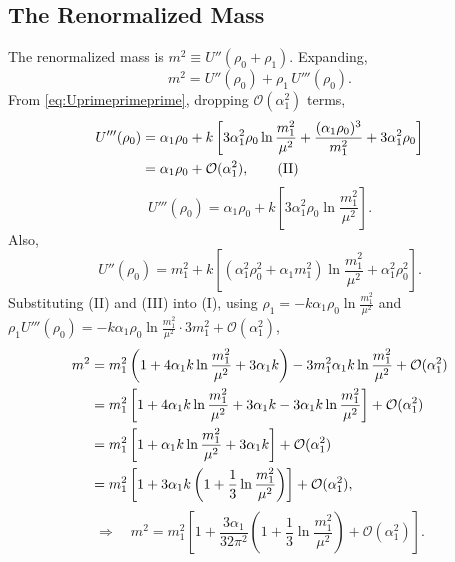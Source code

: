 \subsection*{The Renormalized Mass}

The renormalized mass is $m^2 \equiv U''(\rho_0+\rho_1)$. Expanding,
\begin{equation}
    m^2 = U''(\rho_0) + \rho_1\,U'''(\rho_0). \tag{I}
\end{equation}
From \eqref{eq:Uprimeprimeprime}, dropping $\mathcal{O}(\alpha_1^2)$
terms,
\begin{align}
    U'''(\rho_0) &= \alpha_1\rho_0 + k\left[3\alpha_1^2\rho_0
    \ln\frac{m_1^2}{\mu^2}
    + \frac{(\alpha_1\rho_0)^3}{m_1^2}
    + 3\alpha_1^2\rho_0\right] \notag\\
    &= \alpha_1\rho_0 + \mathcal{O}(\alpha_1^2), \tag{II}
\end{align}
\begin{equation}
    U'''(\rho_0) = \alpha_1\rho_0
    + k\left[3\alpha_1^2\rho_0\ln\frac{m_1^2}{\mu^2}\right]. \tag{III}
\end{equation}
Also,
\begin{equation}
    U''(\rho_0) = m_1^2 + k\left[(\alpha_1^2\rho_0^2
    + \alpha_1 m_1^2)\ln\frac{m_1^2}{\mu^2}
    + \alpha_1^2\rho_0^2\right].
\end{equation}
Substituting (II) and (III) into (I), using
$\rho_1 = -k\alpha_1\rho_0\ln\frac{m_1^2}{\mu^2}$ and
$\rho_1 U'''(\rho_0) = -k\alpha_1\rho_0\ln\frac{m_1^2}{\mu^2}
\cdot 3m_1^2 + \mathcal{O}(\alpha_1^2)$,
\begin{align}
    m^2 &= m_1^2\left(1 + 4\alpha_1 k\ln\frac{m_1^2}{\mu^2}
    + 3\alpha_1 k\right)
    - 3m_1^2\alpha_1 k\ln\frac{m_1^2}{\mu^2}
    + \mathcal{O}(\alpha_1^2) \notag\\
    &= m_1^2\left[1 + 4\alpha_1 k\ln\frac{m_1^2}{\mu^2} + 3\alpha_1 k
    - 3\alpha_1 k\ln\frac{m_1^2}{\mu^2}\right]
    + \mathcal{O}(\alpha_1^2) \notag\\
    &= m_1^2\left[1 + \alpha_1 k\ln\frac{m_1^2}{\mu^2}
    + 3\alpha_1 k\right] + \mathcal{O}(\alpha_1^2) \notag\\
    &= m_1^2\left[1 + 3\alpha_1 k\left(1
    + \frac{1}{3}\ln\frac{m_1^2}{\mu^2}\right)\right]
    + \mathcal{O}(\alpha_1^2),
\end{align}
\begin{equation}
    \Rightarrow\quad\boxed{m^2 = m_1^2\left[1
    + \frac{3\alpha_1}{32\pi^2}\left(1
    + \frac{1}{3}\ln\frac{m_1^2}{\mu^2}\right)
    + \mathcal{O}(\alpha_1^2)\right].}
\end{equation}

